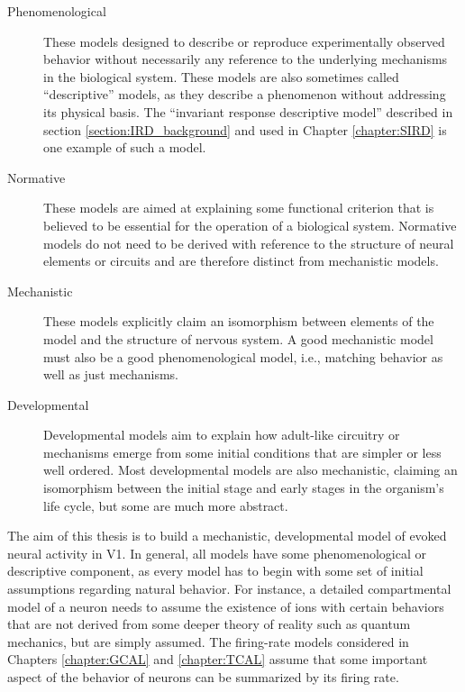 \documentclass[phd,ianc,twoside]{infthesis}
\begin{document}

\begin{description}
\item[Phenomenological] These models designed to describe or reproduce
  experimentally observed behavior without necessarily any reference to the underlying
  mechanisms in the biological system. These models are also sometimes
  called ``descriptive'' models, as they describe a phenomenon without
  addressing its physical basis.  The ``invariant response
  descriptive model'' described in section \ref{section:IRD_background}
  and used in Chapter \ref{chapter:SIRD}
  is one example of such a model.

\item[Normative] These models are aimed at explaining some functional
  criterion that is believed to be essential for the operation of a
  biological system. Normative models do not need to be derived with
  reference to the structure of neural elements or circuits and are
  therefore distinct from mechanistic models.

\item[Mechanistic] These models explicitly claim an
  isomorphism between elements of the model and the structure of
  nervous system.  A good mechanistic model must also be a good
  phenomenological model, i.e., matching behavior as well as just
  mechanisms.

\item[Developmental] Developmental models aim to explain how
  adult-like circuitry or mechanisms emerge from some initial
  conditions that are simpler or less well ordered.  Most
  developmental models are also mechanistic, claiming an isomorphism
  between the initial stage and early stages in the organism's life
  cycle, but some are much more abstract.
\end{description}

The aim of this thesis is to build a mechanistic, developmental model
of evoked neural activity in V1.
In general, all models have some phenomenological or descriptive
component, as every model has to begin with some set of initial
assumptions regarding natural behavior. For instance, a detailed
compartmental model of a neuron needs to assume the existence of ions with certain
behaviors that are not derived from some deeper theory of reality such
as quantum mechanics, but are simply assumed. The firing-rate models
considered in Chapters \ref{chapter:GCAL} and \ref{chapter:TCAL}
assume that some important aspect of the behavior of neurons can be
summarized by its firing rate.
\end{document}
